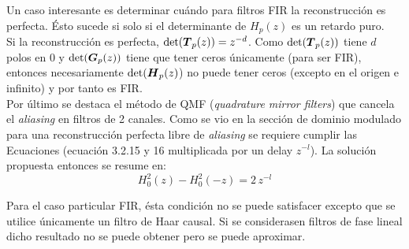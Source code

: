		Un caso interesante es determinar cuándo para filtros FIR la reconstrucción es perfecta. Ésto sucede si solo si el determinante de $H_p(z)$ es un retardo puro.\\
		\indent Si la reconstrucción es perfecta, $\det(\boldsymbol{T}_p(z)) = z^{-d}$. Como $\det(\boldsymbol{T}_p(z))$ tiene $d$ polos en 0 y $\det(\boldsymbol{G}_p(z))$ tiene que tener ceros únicamente (para ser FIR), entonces necesariamente $\det(\boldsymbol{H}_p(z)$) no puede tener ceros (excepto en el origen e infinito) y por tanto es FIR.\\

		Por último se destaca el método de QMF (\emph{quadrature mirror filters}) que cancela el \emph{aliasing} en filtros de 2 canales. Como se vio en la sección de dominio modulado para una reconstrucción perfecta libre de \emph{aliasing} se requiere cumplir las Ecuaciones (ecuación 3.2.15 y 16 multiplicada por un delay $z^{-l}$). La solución propuesta entonces se resume en:
		\begin{equation*}
			H^2_0 (z) - H^2_0 (-z) = 2\, z^{-l}
		\end{equation*}

		Para el caso particular FIR, ésta condición no se puede satisfacer excepto que se utilice únicamente un filtro de Haar causal. Si se considerasen filtros de fase lineal dicho resultado no se puede obtener pero se puede aproximar.



